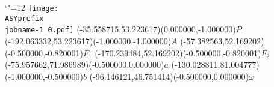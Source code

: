 \setlength{\unitlength}{1pt}
\makeatletter%
\let\ASYencoding\f@encoding%
\let\ASYfamily\f@family%
\let\ASYseries\f@series%
\let\ASYshape\f@shape%
\makeatother%
{\catcode`"=12%
\texttt{[image: \\ASYprefix\\jobname-1\_0.pdf]}%
}%
\color{ASYcolor}
\fontsize{12.000000}{14.400000}\selectfont
\usefont{\ASYencoding}{\ASYfamily}{\ASYseries}{\ASYshape}%
\ASYalign(-35.558715,53.223617)(0.000000,-1.000000){$P$}%
\color{ASYcolor}
\fontsize{12.000000}{14.400000}\selectfont
\ASYalign(-192.063332,53.223617)(-1.000000,-1.000000){$A$}%
\color{ASYcolor}
\fontsize{12.000000}{14.400000}\selectfont
\ASYalign(-57.382563,52.169202)(-0.500000,-0.820001){$F_1$}%
\color{ASYcolor}
\fontsize{12.000000}{14.400000}\selectfont
\ASYalign(-170.239484,52.169202)(-0.500000,-0.820001){$F_2$}%
\color{ASYcolor}
\fontsize{12.000000}{14.400000}\selectfont
\ASYalign(-75.957662,71.986989)(-0.500000,0.000000){$a$}%
\color{ASYcolor}
\fontsize{12.000000}{14.400000}\selectfont
\ASYalign(-130.028811,81.004777)(-1.000000,-0.500000){$b$}%
\color{ASYcolor}
\fontsize{12.000000}{14.400000}\selectfont
\ASYalign(-96.146121,46.751414)(-0.500000,0.000000){$\omega$}%
